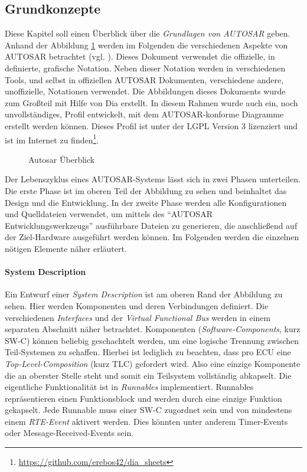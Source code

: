 \documentclass[
  a4paper,					    %
  twoside,
  DIV=calc,     				%
  bibliography=totoc,
  cleardoublepage=empty,
  ngerman,     					%
  final       					%
]{scrbook}
\begin{document}
\subsection{Grundkonzepte}
\label{sec:Grundkonzepte}
Diese Kapitel soll einen Überblick über die \emph{Grundlagen von AUTOSAR} geben. Anhand der Abbildung \ref{fig:autosar_overview} werden im Folgenden die verschiedenen Aspekte von AUTOSAR betrachtet (vgl. \cite{autosar_techoverview}). Dieses Dokument verwendet die offizielle, in \cite{autosar_graph} definierte, grafische Notation. Neben dieser Notation werden in verschiedenen Tools, und selbst in offiziellen AUTOSAR Dokumenten, verschiedene andere, unoffizielle, Notationen verwendet. Die Abbildungen dieses Dokuments wurde zum Großteil mit Hilfe von Dia erstellt. In diesem Rahmen wurde auch ein, noch unvollständiges, Profil entwickelt, mit dem AUTOSAR-konforme Diagramme erstellt werden können. Dieses Profil ist unter der LGPL Version 3 lizenziert und ist im Internet zu finden\footnote{\url{https://github.com/erebos42/dia_sheets}}.

\begin{figure}[p]
    \centering
    \resizebox{\linewidth}{!}{}
    \caption{Autosar Überblick}
    \label{fig:autosar_overview}
\end{figure}

Der Lebenszyklus eines AUTOSAR-Systems lässt sich in zwei Phasen unterteilen. Die erste Phase ist im oberen Teil der Abbildung zu sehen und beinhaltet das Design und die Entwicklung. In der zweite Phase werden alle Konfigurationen und Quelldateien verwendet, um mittels des "`AUTOSAR Entwicklungswerkzeugs"'  ausführbare Dateien zu generieren, die anschließend auf der Ziel-Hardware ausgeführt werden können. Im Folgenden werden die einzelnen nötigen Elemente näher erläutert.


\paragraph{System Description} Ein Entwurf einer \emph{System Description} ist am oberen Rand der Abbildung zu sehen. Hier werden Komponenten und deren Verbindungen definiert. Die verschiedenen \emph{Interfaces} und der \emph{Virtual Functional Bus} werden in einem separaten Abschnitt näher betrachtet. Komponenten (\emph{Software-Components}, kurz SW-C) können beliebig geschachtelt werden, um eine logische Trennung zwischen Teil-Systemen zu schaffen. Hierbei ist lediglich zu beachten, dass pro ECU eine \emph{Top-Level-Composition} (kurz TLC) gefordert wird. Also eine einzige Komponente die an oberster Stelle steht und somit ein Teilsystem vollständig abkapselt. Die eigentliche Funktionalität ist in \emph{Runnables} implementiert. Runnables repräsentieren einen Funktionsblock und werden durch eine einzige Funktion gekapselt. Jede Runnable muss einer SW-C zugordnet sein und von mindestens einem \emph{RTE-Event} aktivert werden. Dies könnten unter anderem Timer-Events oder Message-Received-Events sein.
\end{document}

